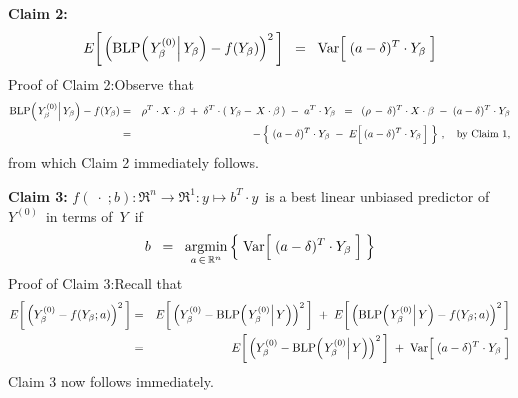 \begin{enumerate}
	\vskip 0.8cm
	\noindent
	\textbf{Claim 2:}
	\begin{equation*}
	E\!\left[\,\left(\blp\!\left(\left.Y^{(0)}_{\beta}\right\vert Y_{\beta}\right) \overset{{\color{white}.}}{-} f(Y_{\beta})\right)^{2}\,\right]
	\;\; = \;\;
		\Var\!\left[\;(a \overset{{\color{white}.}}{-} \delta)^{T}\cdot Y_{\beta}\;\right]
	\end{equation*}
	Proof of Claim 2:\quad Observe that
	\begin{eqnarray*}
	\blp\!\left(\left.Y^{(0)}_{\beta}\right\vert Y_{\beta}\right) - f(Y_{\beta})
	&=&
		\rho^{T} \cdot X \cdot \beta \; + \; \delta^{T}\cdot(\;Y_{\beta} - \,X\cdot\beta\,) \; - \; a^{T} \cdot Y_{\beta}
	\;\; = \;\;
		(\rho \, - \, \delta)^{T} \cdot X \cdot \beta \; - \; (a - \delta)^{T} \cdot Y_{\beta}
	\\
	&=&
		- \left\{\;
			(a - \delta)^{T} \cdot Y_{\beta} \; - \; E\!\left[\,(a \overset{{\color{white}.}}{-} \delta)^{T} \cdot Y_{\beta}\,\right]
			 \;\right\}\,,
		\quad\textnormal{by Claim 1},
	\end{eqnarray*}
	from which Claim 2 immediately follows.

	\vskip 0.5cm
	\noindent
	\textbf{Claim 3:}\quad
	$f(\;\cdot\;;b) : \Re^{n} \longrightarrow \Re^{1} : y \longmapsto b^{T} \cdot y$\,
	is a best linear unbiased predictor of \,$Y^{(0)}$\, in terms of \,$Y$\, if
	\begin{equation*}
	b \;\; = \;\;
		\underset{a\,\in\,\Re^{n}}{\textnormal{argmin}}
		\left\{\;
			\Var\!\left[\;(a \overset{{\color{white}.}}{-} \delta)^{T}\cdot Y_{\beta}\;\right]
			\;\right\}
	\end{equation*}
	Proof of Claim 3:\quad Recall that
	\begin{eqnarray*}
	E\!\left[\,\left(Y^{(0)}_{\beta} \overset{{\color{white}.}}{-} f(Y_{\beta};a)\right)^{2}\,\right]
	& = &
		E\!\left[\,\left(Y^{(0)}_{\beta} \overset{{\color{white}.}}{-} \blp\!\left(\left.Y^{(0)}_{\beta}\right\vert Y\right)\right)^{2}\,\right]
		\; + \;
		E\!\left[\,\left(\blp\!\left(\left.Y^{(0)}_{\beta}\right\vert Y\right) \overset{{\color{white}.}}{-} f(Y_{\beta};a)\right)^{2}\,\right]
	\\
	& = &
		E\!\left[\,\left(Y^{(0)}_{\beta} \overset{{\color{white}.}}{-} \blp\!\left(\left.Y^{(0)}_{\beta}\right\vert Y\right)\right)^{2}\,\right]
		\; + \;
		\Var\!\left[\;(a \overset{{\color{white}.}}{-} \delta)^{T}\cdot Y_{\beta}\;\right]
	\end{eqnarray*}
	Claim 3 now follows immediately.

\end{enumerate}

